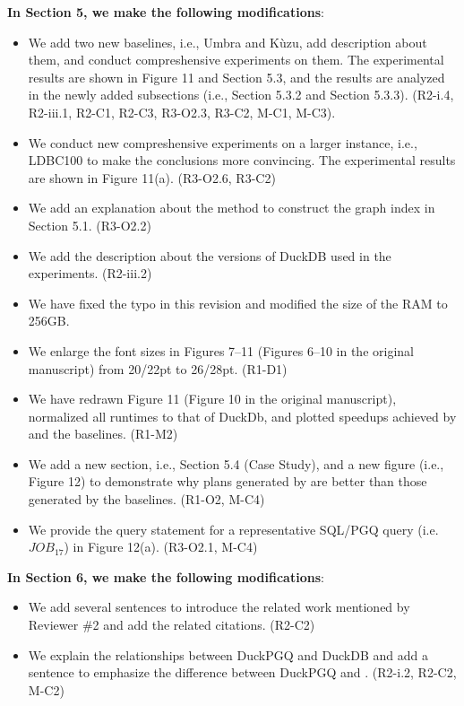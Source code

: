 \textbf{In Section 5, we make the following modifications}:
\begin{itemize}
	\item We add two new baselines, i.e., Umbra and K\`uzu, add description about them, and conduct compreshensive experiments on them. The experimental results are shown in Figure 11 and Section 5.3, and the results are analyzed in the newly added subsections (i.e., Section 5.3.2 and Section 5.3.3). (R2-i.4, R2-iii.1, R2-C1, R2-C3, R3-O2.3, R3-C2, M-C1, M-C3). 
	\item We conduct new compreshensive experiments on a larger instance, i.e., LDBC100 to make the conclusions more convincing. The experimental results are shown in Figure 11(a). (R3-O2.6, R3-C2)
	\item We add an explanation about the method to construct the graph index in Section 5.1. (R3-O2.2)
	\item We add the description about the versions of DuckDB used in the experiments. (R2-iii.2)
	\item We have fixed the typo in this revision and modified the size of the RAM to 256GB.
	\item We enlarge the font sizes in Figures 7--11 (Figures 6--10 in the original manuscript) from 20/22pt to 26/28pt. (R1-D1)
	\item We have redrawn Figure 11 (Figure 10 in the original manuscript), normalized all runtimes to that of DuckDb, and plotted speedups achieved by \name and the baselines. (R1-M2)
	\item We add a new section, i.e., Section 5.4 (Case Study), and a new figure (i.e., Figure 12) to demonstrate why plans generated by \name are better than those generated by the baselines. (R1-O2, M-C4)
	\item We provide the query statement for a representative SQL/PGQ query (i.e. $JOB_{17}$) in Figure 12(a). (R3-O2.1, M-C4)
\end{itemize}

\textbf{In Section 6, we make the following modifications}:
\begin{itemize}
	\item We add several sentences to introduce the related work mentioned by Reviewer \#2 and add the related citations. (R2-C2)
	\item We explain the relationships between DuckPGQ and DuckDB and add a sentence to emphasize the difference between DuckPGQ and \name. (R2-i.2, R2-C2, M-C2)
\end{itemize}

